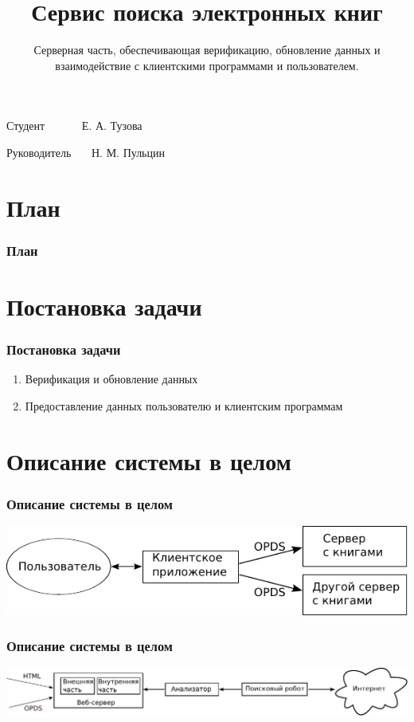 \documentclass[handout]{beamer}
\title{Сервис поиска электронных книг }
\subtitle{Серверная часть, обеспечивающая верификацию, обновление данных и взаимодействие с клиентскими программами и пользователем.}
\date{}
\begin{document}
\begin{frame}
  \titlepage

  \begin{flushright}
    Студент~~~~~~  Е. А. Тузова
  
    Руководитель~~~  Н. М. Пульцин

  \end{flushright}
\end{frame}

\section*{План}
  \begin{frame}
    \frametitle{План}
    \tableofcontents[pausesections]

  \end{frame}

\section{Постановка задачи}
  \begin{frame}

    \frametitle{Постановка задачи}
    \begin{enumerate}
      \item Верификация и обновление данных
      \item Предоставление данных пользователю и клиентским программам
    \end{enumerate}
  \end{frame}

\section{Описание системы в целом}
  \begin{frame}
    \frametitle{Описание системы в целом}

    \includegraphics{./head/scheme}
  \end{frame}

  \begin{frame}
    \frametitle{Описание системы в целом}

    \includegraphics[width=1.05\textwidth]{./head/innerstructure}
  \end{frame}  
\end{document}
